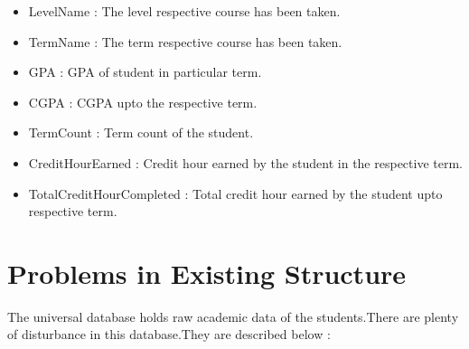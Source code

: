 \documentclass[a4paper,12pt]{book}
\begin{document}
\begin{itemize}
\item LevelName : The level respective course has been taken.
\item TermName : The term respective course has been taken.
\item GPA : GPA of student in particular term.
\item CGPA : CGPA upto the respective term.
\item TermCount : Term count of the student.
\item CreditHourEarned : Credit hour earned by the student in the respective term.
\item TotalCreditHourCompleted : Total credit hour earned by the student upto respective term.
\end{itemize}



\section{Problems in Existing Structure}
The universal database holds raw academic data of the students.There are plenty of disturbance in this database.They are described below :
\end{document}
